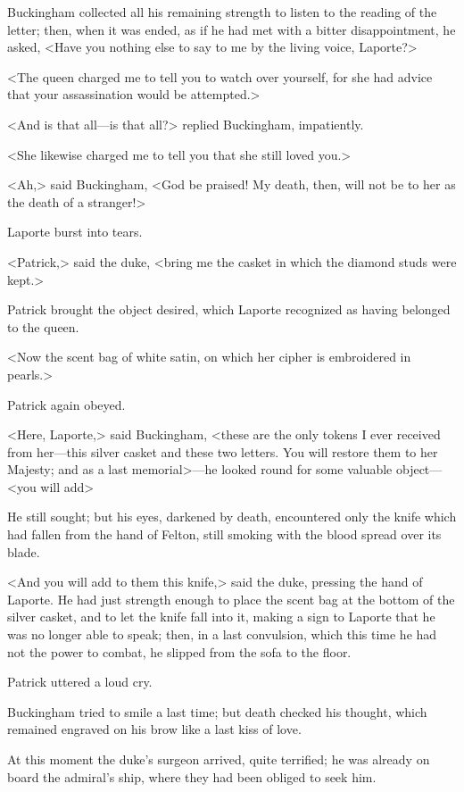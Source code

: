 Buckingham collected all his remaining strength to listen to the reading of the letter; then, when it was ended, as if he had met with a bitter disappointment, he asked, <Have you nothing else to say to me by the living voice, Laporte?> 

<The queen charged me to tell you to watch over yourself, for she had advice that your assassination would be attempted.> 

<And is that all—is that all?> replied Buckingham, impatiently. 

<She likewise charged me to tell you that she still loved you.> 

<Ah,> said Buckingham, <God be praised! My death, then, will not be to her as the death of a stranger!> 

Laporte burst into tears. 

<Patrick,> said the duke, <bring me the casket in which the diamond studs were kept.> 

Patrick brought the object desired, which Laporte recognized as having belonged to the queen. 

<Now the scent bag of white satin, on which her cipher is embroidered in pearls.> 

Patrick again obeyed. 

<Here, Laporte,> said Buckingham, <these are the only tokens I ever received from her—this silver casket and these two letters. You will restore them to her Majesty; and as a last memorial>—he looked round for some valuable object—<you will add\longdash> 

He still sought; but his eyes, darkened by death, encountered only the knife which had fallen from the hand of Felton, still smoking with the blood spread over its blade. 

<And you will add to them this knife,> said the duke, pressing the hand of Laporte. He had just strength enough to place the scent bag at the bottom of the silver casket, and to let the knife fall into it, making a sign to Laporte that he was no longer able to speak; then, in a last convulsion, which this time he had not the power to combat, he slipped from the sofa to the floor. 

Patrick uttered a loud cry. 

Buckingham tried to smile a last time; but death checked his thought, which remained engraved on his brow like a last kiss of love. 

At this moment the duke's surgeon arrived, quite terrified; he was already on board the admiral's ship, where they had been obliged to seek him. 

